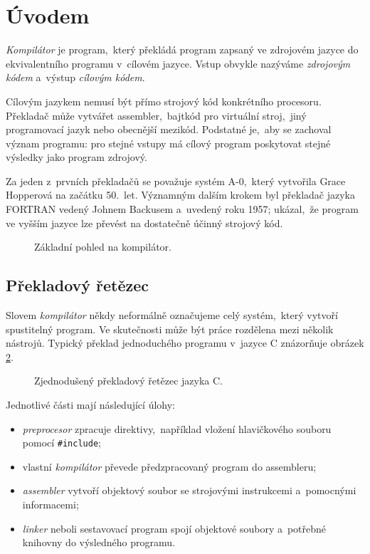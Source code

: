 \section{Úvodem}\label{sec:kompilatory-uvod}

\emph{Kompilátor} je program,~který překládá program zapsaný ve zdrojovém jazyce do ekvivalentního programu v~cílovém jazyce. Vstup obvykle nazýváme \emph{zdrojovým kódem} a~výstup \emph{cílovým kódem}.

Cílovým jazykem nemusí být přímo strojový kód konkrétního procesoru. Překladač může vytvářet assembler,~bajtkód pro virtuální stroj,~jiný programovací jazyk nebo obecnější mezikód. Podstatné je,~aby se zachoval význam programu: pro stejné vstupy má cílový program poskytovat stejné výsledky jako program zdrojový.

\begin{remark}
    Za jeden z~prvních překladačů se považuje systém A-0,~který vytvořila Grace Hopperová na začátku 50.~let. Významným dalším krokem byl překladač jazyka FORTRAN vedený Johnem Backusem a~uvedený roku 1957; ukázal,~že program ve vyšším jazyce lze převést na dostatečně účinný strojový kód.
\end{remark}

\begin{figure}[h]
    \centering
    
    \caption{Základní pohled na kompilátor.}
    \label{fig:kompilator-zaklad}
\end{figure}

\subsection{Překladový řetězec}

Slovem \emph{kompilátor} někdy neformálně označujeme celý systém,~který vytvoří spustitelný program. Ve skutečnosti může být práce rozdělena mezi několik nástrojů. Typický překlad jednoduchého programu v~jazyce C znázorňuje obrázek \ref{fig:prekladovy-retezec-c}.

\begin{figure}[h]
    \centering
    
    \caption{Zjednodušený překladový řetězec jazyka C.}
    \label{fig:prekladovy-retezec-c}
\end{figure}

Jednotlivé části mají následující úlohy:
\begin{itemize}
    \item \emph{preprocesor} zpracuje direktivy,~například vložení hlavičkového souboru pomocí \texttt{\#include};
    \item vlastní \emph{kompilátor} převede předzpracovaný program do assembleru;
    \item \emph{assembler} vytvoří objektový soubor se strojovými instrukcemi a~pomocnými informacemi;
    \item \emph{linker} neboli sestavovací program spojí objektové soubory a~potřebné knihovny do výsledného programu.
\end{itemize}

